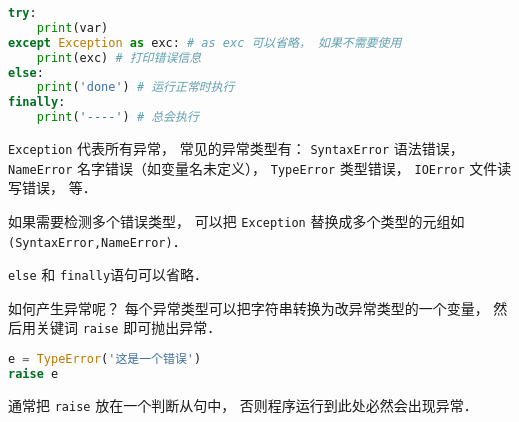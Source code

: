 
\begin{issues}
\issueDraft
\end{issues}

\begin{lstlisting}[language=python]
try:
    print(var)
except Exception as exc: # as exc 可以省略， 如果不需要使用
    print(exc) # 打印错误信息
else:
    print('done') # 运行正常时执行
finally:
    print('----') # 总会执行
\end{lstlisting}

\verb|Exception| 代表所有异常， 常见的异常类型有： \verb|SyntaxError| 语法错误， \verb|NameError| 名字错误（如变量名未定义）， \verb|TypeError| 类型错误， \verb|IOError| 文件读写错误， 等．

如果需要检测多个错误类型， 可以把 \verb|Exception| 替换成多个类型的元组如 \verb|(SyntaxError,NameError)|．

\verb|else| 和 \verb|finally|语句可以省略．

如何产生异常呢？ 每个异常类型可以把字符串转换为改异常类型的一个变量， 然后用关键词 \verb|raise| 即可抛出异常．
\begin{lstlisting}[language=python]
e = TypeError('这是一个错误')
raise e
\end{lstlisting}
通常把 \verb|raise| 放在一个判断从句中， 否则程序运行到此处必然会出现异常．
